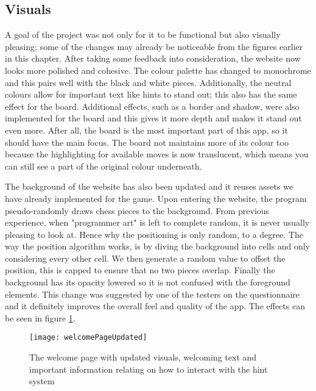 \subsection{Visuals}
\label{VisualsFeedback}

A goal of the project was not only for it to be functional but also visually pleasing; some of the changes may already be noticeable from the figures earlier in this chapter. After taking some feedback into consideration, the website now looks more polished and cohesive. The colour palette has changed to monochrome and this pairs well with the black and white pieces. Additionally, the neutral colours allow for important text like hints to stand out; this also has the same effect for the board. Additional effects, such as a border and shadow, were also implemented for the board and this gives it more depth and makes it stand out even more. After all, the board is the most important part of this app, so it should have the main focus. The board not maintains more of its colour too because the highlighting for available moves is now translucent, which means you can still see a part of the original colour underneath.

The background of the website has also been updated and it reuses assets we have already implemented for the game. Upon entering the website, the program pseudo-randomly draws chess pieces to the background. From previous experience, when "programmer art" is left to  complete random, it is never usually pleasing to look at. Hence why the positioning is only random, to a degree. The way the position algorithm works, is by diving the background into cells and only considering every other cell. We then generate a random value to offset the position, this is capped to ensure that no two pieces overlap. Finally the background has its opacity lowered so it is not confused with the foreground elements. This change was suggested by one of the testers on the questionnaire and it definitely improves the overall feel and quality of the app. The effects can be seen in figure \ref{welcomePageUpdated}.

\begin{figure}
    \begin{center}
        \texttt{[image: welcomePageUpdated]}
        \caption{The welcome page with updated visuals, welcoming text and important information relating on how to interact with the hint system}
        \label{welcomePageUpdated}
    \end{center}
\end{figure}

